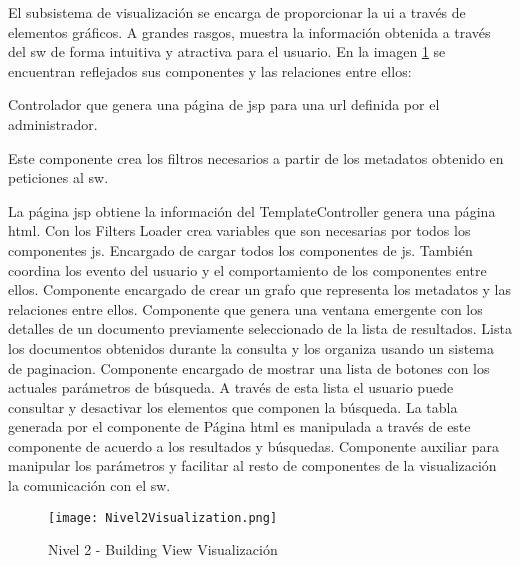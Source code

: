 El subsistema de visualización se encarga de proporcionar la \gls{ui} a través de elementos gráficos. A grandes rasgos, muestra la información obtenida a través del \gls{sw} de forma intuitiva y atractiva para el usuario. En la imagen \ref{image:level2-visual} se encuentran reflejados sus componentes y las relaciones entre ellos:

\begin{itemize}
    Controlador que genera una página de \gls{jsp} para una \gls{url} definida por el administrador. 
    
    Este componente crea los filtros necesarios a partir de los \glspl{metadato} obtenido en peticiones al \gls{sw}.
    
    La página \gls{jsp} obtiene la información del TemplateController genera una página \gls{html}. Con los Filters Loader crea variables que son necesarias por todos los componentes \gls{js}.
    Encargado de cargar todos los componentes de \gls{js}. También coordina los evento del usuario y el comportamiento de los componentes entre ellos.
    Componente encargado de crear un grafo que representa los \glspl{metadato} y las relaciones entre ellos.
    Componente que genera una ventana emergente con los detalles de un documento previamente seleccionado de la lista de resultados.
	Lista los documentos obtenidos durante la consulta y los organiza usando un sistema de \gls{paginacion}.
    Componente encargado de mostrar una lista de botones con los actuales parámetros de búsqueda. A través de esta lista el usuario puede consultar y desactivar los elementos que componen la búsqueda.
    La tabla generada por el componente de Página \gls{html} es manipulada a través de este componente de acuerdo a los resultados y búsquedas.
    Componente auxiliar para manipular los parámetros y facilitar al resto de componentes de la visualización la comunicación con el \gls{sw}. 
\end{itemize}
\begin{figure}[H]
  \centering
     \texttt{[image: Nivel2Visualization.png]}
  \caption{Nivel 2 - Building View Visualización}
  \label{image:level2-visual}
\end{figure}

